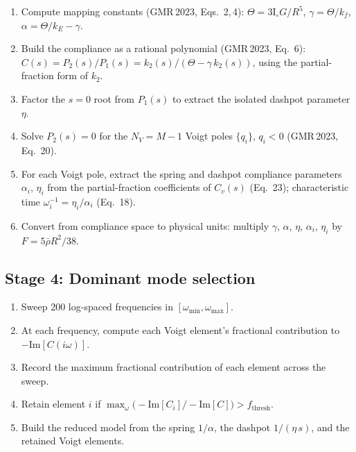 \documentclass[11pt]{article}
\begin{document}
\begin{enumerate}[leftmargin=2em, resume]
  \item Compute mapping constants
    (GMR\,2023, Eqs.~2,\,4):
    $\Theta = 3\mathrm{I}_\circ G/R^5$,\;
    $\gamma = \Theta / k_f$,\;
    $\alpha = \Theta / k_E - \gamma$.

  \item Build the compliance as a rational polynomial
    (GMR\,2023, Eq.~6):
    $C(s) = P_2(s) / P_1(s)
    = k_2(s) / (\Theta - \gamma\, k_2(s))$,
    using the partial-fraction form of $k_2$.

  \item Factor the $s = 0$ root from $P_1(s)$ to
    extract the isolated dashpot parameter $\eta$.

  \item Solve $P_2(s) = 0$ for the $N_V = M-1$
    Voigt poles $\{q_i\}$, $q_i < 0$ (GMR\,2023, Eq.~20).

  \item For each Voigt pole, extract the spring and dashpot
    compliance parameters $\alpha_i$, $\eta_i$ from the
    partial-fraction coefficients of $C_v(s)$ (Eq.~23);
    characteristic time $\omega_i^{-1} = \eta_i / \alpha_i$ (Eq.~18).

  \item Convert from compliance space to physical units:
    multiply $\gamma$, $\alpha$, $\eta$, $\alpha_i$, $\eta_i$ by
    $F = 5\bar\rho R^2 / 38$.
\end{enumerate}

\subsection*{Stage 4: Dominant mode selection}

\begin{enumerate}[leftmargin=2em, resume]
  \item Sweep 200 log-spaced frequencies in
    $[\omega_{\min}, \omega_{\max}]$.

  \item At each frequency, compute each Voigt element's fractional
    contribution to $-\mathrm{Im}[C(i\omega)]$.

  \item Record the maximum fractional contribution of each element
    across the sweep.

  \item Retain element $i$ if
    $\max_\omega\bigl(-\mathrm{Im}[C_i] / -\mathrm{Im}[C]\bigr) >
    f_{\mathrm{thresh}}$.

  \item Build the reduced model from the spring $1/\alpha$, the
    dashpot $1/(\eta\,s)$, and the retained Voigt elements.
\end{enumerate}
\end{document}
